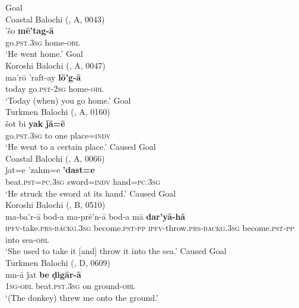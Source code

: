 \documentclass[output=paper,colorlinks,citecolor=brown,draftmode]{langscibook}
\begin{document}
\ea\label{Balochi:ex:17}
\ea\label{Balochi:ex:17a}
Goal \\
Coastal Balochi (\citealt{nourzaei_balochi_coastal_2021}, A, 0043) \\
\gll 'šo \textbf{mē'tag-ā} \\
go.\textsc{pst}.\textsc{3sg} home-\textsc{obl} \\
\glt `{H}e went home.'
\ex\label{Balochi:ex:17b}
Goal \\
Koroshi Balochi (\citealt{nourzaei_balochi_koroshi_2021}, A, 0047)\\
\gll ma'rō 'raft-ay \textbf{lō'g-ā} \\
today go.\textsc{pst}-\textsc{2sg} home-\textsc{obl} \\
\glt `{T}oday (when) you go home.'
\ex\label{Balochi:ex:17c}
Goal \\
Turkmen Balochi (\citealt{haig_balochi_2022}, A, 0160)\\
\gll šot bi \textbf{yak} \textbf{ǰā=ē} \\
go.\textsc{pst}.\textsc{3sg} to one place=\textsc{indv} \\
\glt `{H}e went to a certain place.'
\ex\label{Balochi:ex:17d}
Caused Goal \\
Coastal Balochi (\citealt{nourzaei_balochi_coastal_2021}, A, 0066)\\
\gll ǰat=e 'zahm=e \textbf{'dast=e}  \\
beat.\textsc{pst}=\textsc{pc}.\textsc{3sg} sword=\textsc{indv} hand=\textsc{pc}.\textsc{3sg} \\
\glt `{H}e struck the sword at its hand.'
\ex\label{Balochi:ex:17e}
Caused Goal \\
Koroshi Balochi (\citealt{nourzaei_balochi_koroshi_2021}, B, 0510)\\
\gll ma-ba'r-ā bod-a ma-prē'n-ā bod-a mā \textbf{dar'yā-hā} \\
\textsc{ipfv}-take.\textsc{prs}-\textsc{backg}.\textsc{3sg} become.\textsc{pst}-\textsc{pp} \textsc{ipfv}-throw.\textsc{prs}-\textsc{backg.3sg} become.\textsc{pst}-\textsc{pp} into sea-\textsc{obl} \\
\glt `{S}he used to take it [and] throw it into the sea.'
\ex\label{Balochi:ex:17f}
Caused Goal \\
Turkmen Balochi (\citealt{haig_balochi_2022}, D, 0609)\\
\gll mn-ā ǰat \textbf{be} \textbf{ḍigār-ā} \\
\textsc{1sg}-\textsc{obl} beat.\textsc{pst}.\textsc{3sg} on ground-\textsc{obl} \\
\glt `({T}he donkey) threw me onto the ground.'
\z
\z
\end{document}
